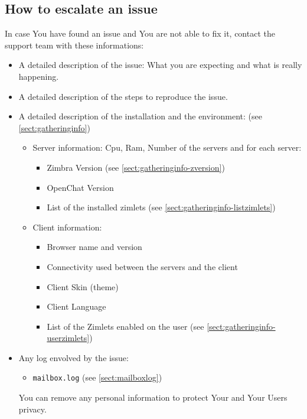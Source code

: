     \subsection[Escalate an issue]{How to escalate an issue}
    \label{sect:how_to_escalate_an_issue}
        In case You have found an issue and You are not able to fix it, contact the support team with these informations:
        \begin{itemize}
            \item A detailed description of the issue: What you are expecting and what is really happening.
            \item A detailed description of the steps to reproduce the issue.
            \item A detailed description of the installation and the environment: (see \autoref{sect:gatheringinfo})
            \begin{itemize}
                \item Server information: Cpu, Ram, Number of the servers and for each server:
                \begin{itemize}
                    \item Zimbra Version (see \autoref{sect:gatheringinfo-zversion})
                    \item OpenChat Version
                    \item List of the installed zimlets (see \autoref{sect:gatheringinfo-listzimlets})
                \end{itemize}
                \item Client information:
                \begin{itemize}
                    \item Browser name and version
                    \item Connectivity used between the servers and the client
                    \item Client Skin (theme)
                    \item Client Language
                    \item List of the Zimlets enabled on the user (see \autoref{sect:gatheringinfo-userzimlets})
                \end{itemize}
            \end{itemize}
            \item Any log envolved by the issue:
            \begin{itemize}
                \item \verb+mailbox.log+ (see \autoref{sect:mailboxlog})
            \end{itemize}
            You can remove any personal information to protect Your and Your Users privacy.
        \end{itemize}
